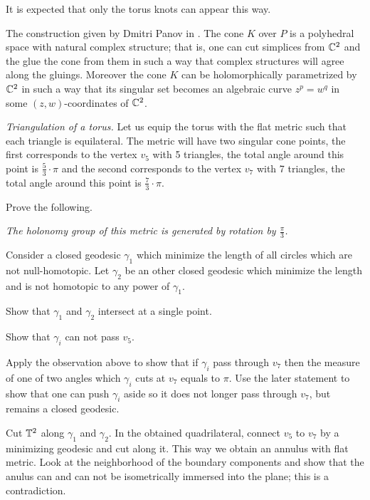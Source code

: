 It is expected that only the torus knots can appear this way.

The construction given by Dmitri Panov in \cite{panov-Kaeler}.
The cone $K$ over $P$ is a polyhedral space with natural complex structure;
that is, one can cut simplices from $\mathbb{C}^2$ and the glue the cone from them in such a way that complex structures will agree along the gluings.
Moreover the cone $K$ can be holomorphically parametrized by $\mathbb{C}^2$ in such a way that its singular set becomes an algebraic curve $z^p=w^q$ in some $(z,w)$-coordinates of $\mathbb{C}^2$.



\textit{Triangulation of a torus.}
Let us equip the torus with the flat metric such that each triangle is equilateral.
The metric will have two singular cone points,
the first corresponds to the vertex $v_5$ with 5 triangles,
the total angle around this point is $\tfrac53\cdot\pi$
and the second corresponds to the vertex $v_7$ with 7 triangles,
the total angle around this point is $\tfrac73\cdot\pi$.

Prove the following.

 \textit{The holonomy group of this metric is generated by rotation by $\tfrac\pi3$.}

\medskip

Consider a closed geodesic $\gamma_1$ which minimize the length of all circles which are not null-homotopic.
Let $\gamma_2$ be an other closed geodesic which minimize the length and is not homotopic to any power of $\gamma_1$.

Show that $\gamma_1$ and $\gamma_2$ intersect at a single point.

Show that $\gamma_i$ can not pass $v_5$.

Apply the observation above 
to show that if $\gamma_i$ pass through $v_7$ then the measure  
of one of two angles which $\gamma_i$ cuts at $v_7$ equals to $\pi$.
Use the later statement to show that  
one can push $\gamma_i$ aside so it does not longer pass through $v_7$, but remains a closed geodesic.

Cut $\mathbb{T}^2$ along $\gamma_1$ and $\gamma_2$.
In the obtained quadrilateral, connect $v_5$ to $v_7$ by a minimizing geodesic and cut along it.
This way we obtain an annulus with flat metric.
Look at the neighborhood of the boundary components and show that the anulus can and can not be isometrically immersed into the plane;
this is a contradiction.

